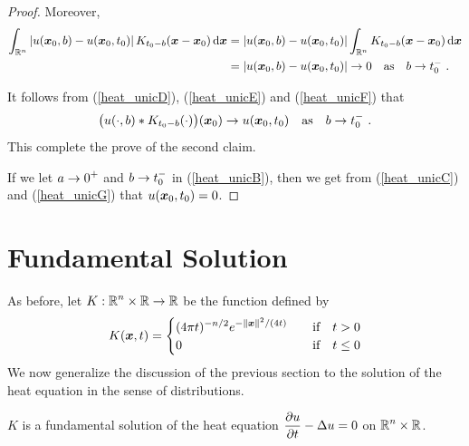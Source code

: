 \begin{proof}
Moreover,
\begin{align}
\int_{\mathbb{R}^n} \left|u({\bm{x}}_0,b) - u({\bm{x}}_0,t_0) \right|
K_{t_0-b}({\bm{x}}-{\bm{x}}_0) \,\mathrm{d}{{\bm{x}}}
& = \left|u({\bm{x}}_0,b) - u({\bm{x}}_0,t_0) \right| \int_{\mathbb{R}^n}  
K_{t_0-b}({\bm{x}}-{\bm{x}}_0) \,\mathrm{d}{{\bm{x}}} \nonumber \\
& = \left|u({\bm{x}}_0,b) - u({\bm{x}}_0,t_0) \right| \to 0
\quad \text{as} \quad b \to t_0^- \ . \label{heat_unicF}
\end{align}

It follows from (\ref{heat_unicD}), (\ref{heat_unicE}) and
(\ref{heat_unicF}) that
\begin{equation} \label{heat_unicG}
\big(u(\cdot, b) \ast K_{t_0-b}(\cdot)\big)({\bm{x}}_0)
\to u({\bm{x}}_0,t_0)
\quad \text{as}\quad b \to t_0^- \ .
\end{equation}
This complete the prove of the second claim.

 If we let $\displaystyle a\to 0^+$ and
$\displaystyle b\to t_0^-$ in (\ref{heat_unicB}), then we get
from (\ref{heat_unicC}) and (\ref{heat_unicG}) that
$u({\bm{x}}_0, t_0) = 0$.
\end{proof}

\section{Fundamental Solution} \label{SectHeatFundSol}

As before, let $\displaystyle K:\mathbb{R}^n \times \mathbb{R} \rightarrow \mathbb{R}$ be
the function defined by
\[
K({\bm{x}},t) =
\begin{cases}
\displaystyle (4\pi t)^{-n/2} e^{-\|{\bm{x}}\|^2/(4t)} & \quad 
\text{if} \quad t>0 \\
0 &  \quad \text{if} \quad t\leq 0
\end{cases}
\]
We now generalize the discussion of the previous section to the
solution of the heat equation in the sense of distributions.

\begin{theorem}
$K$ is a fundamental solution of the heat equation
$\displaystyle \frac{\partial{u}}{\partial t} - \Delta u = 0$ on $\displaystyle \mathbb{R}^n\times \mathbb{R}$.
\end{theorem}

